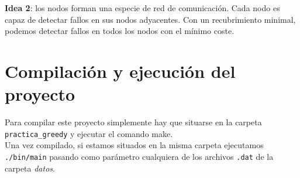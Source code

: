 \documentclass[11pt]{article}
\begin{document}
\textbf{Idea 2}: los nodos forman una especie de red de comunicación. Cada nodo es capaz de detectar fallos en sus nodos adyacentes. Con un recubrimiento minimal, podemos detectar fallos en todos los nodos con el mínimo coste.

\section*{Compilación y ejecución del proyecto}
Para compilar este proyecto simplemente hay que situarse en la carpeta \verb|practica_greedy| y ejecutar el comando make.\\

Una vez compilado, si estamos situados en la misma carpeta ejecutamos \verb|./bin/main| pasando como parámetro cualquiera de los archivos \verb|.dat| de la carpeta \textit{datos}.
\end{document}
